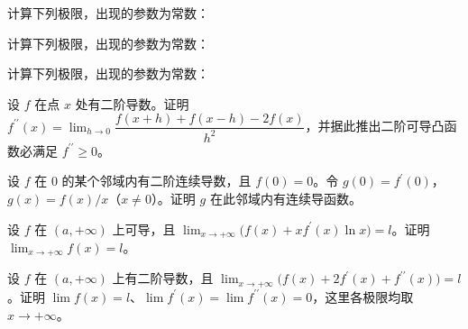 \newpage
\noindent\begin{minipage}{\textwidth}
计算下列极限，出现的参数为常数：
\end{minipage}\par\vfill
\noindent\begin{minipage}{\textwidth}
计算下列极限，出现的参数为常数：
\end{minipage}\par\vfill
\noindent\begin{minipage}{\textwidth}
计算下列极限，出现的参数为常数：
\end{minipage}\par\vfill
\newpage
\noindent\begin{minipage}{\textwidth}
设 $f$ 在点 $x$ 处有二阶导数。证明 $f^{\prime\prime}(x)=\lim_{h\to0}\dfrac{f(x+h)+f(x-h)-2f(x)}{h^2}$，并据此推出二阶可导凸函数必满足 $f^{\prime\prime}\ge0$。
\end{minipage}\par\vfill
\noindent\begin{minipage}{\textwidth}
设 $f$ 在 $0$ 的某个邻域内有二阶连续导数，且 $f(0)=0$。令 $g(0)=f^{\prime}(0)$，$g(x)=f(x)/x$（$x\ne0$）。证明 $g$ 在此邻域内有连续导函数。
\end{minipage}\par\vfill
\noindent\begin{minipage}{\textwidth}
设 $f$ 在 $(a,+\infty)$ 上可导，且 $\lim_{x\to+\infty}\bigl(f(x)+xf^{\prime}(x)\ln x\bigr)=l$。证明 $\lim_{x\to+\infty}f(x)=l$。
\end{minipage}\par\vfill
\newpage
\noindent\begin{minipage}{\textwidth}
设 $f$ 在 $(a,+\infty)$ 上有二阶导数，且 $\lim_{x\to+\infty}\bigl(f(x)+2f^{\prime}(x)+f^{\prime\prime}(x)\bigr)=l$。证明 $\lim f(x)=l$、$\lim f^{\prime}(x)=\lim f^{\prime\prime}(x)=0$，这里各极限均取 $x\to+\infty$。
\end{minipage}\par\vfill
